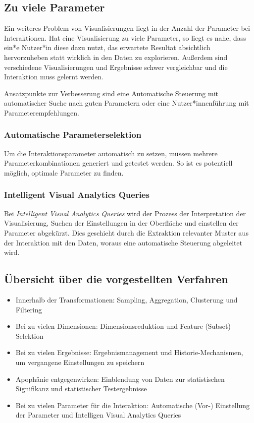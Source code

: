 		\subsection{Zu viele Parameter}
			Ein weiteres Problem von Visualisierungen liegt in der Anzahl der Parameter bei Interaktionen. Hat eine Visualisierung zu viele Parameter, so liegt es nahe, dass ein*e Nutzer*in diese dazu nutzt, das erwartete Resultat absichtlich hervorzuheben statt wirklich in den Daten zu explorieren. Außerdem sind verschiedene Visualisierungen und Ergebnisse schwer vergleichbar und die Interaktion muss gelernt werden.

			Ansatzpunkte zur Verbesserung sind \zB eine Automatische Steuerung mit automatischer Suche nach guten Parametern oder eine Nutzer*innenführung mit Parameterempfehlungen.

			\subsubsection{Automatische Parameterselektion}
				Um die Interaktionsparameter automatisch zu setzen, müssen mehrere Parameterkombinationen generiert und getestet werden. So ist es potentiell möglich, optimale Parameter zu finden.

			\subsubsection{Intelligent Visual Analytics Queries}
				Bei \emph{Intelligent Visual Analytics Queries} wird der Prozess der Interpretation der Visualisierung, Suchen der Einstellungen in der Oberfläche und einstellen der Parameter abgekürzt. Dies geschieht durch die Extraktion relevanter Muster aus der Interaktion mit den Daten, woraus eine automatische Steuerung abgeleitet wird.

		\subsection{Übersicht über die vorgestellten Verfahren}
			\label{subsec:autoVisZsm}

			\begin{itemize}
				\item Innerhalb der Transformationen: Sampling, Aggregation, Clusterung und Filtering
				\item Bei zu vielen Dimensionen: Dimensionsreduktion und Feature (Subset) Selektion
				\item Bei zu vielen Ergebnisse: Ergebnismanagement und Historie-Mechanismen, um vergangene Einstellungen zu speichern
				\item Apophänie entgegenwirken: Einblendung von Daten zur statistischen Signifikanz und statistischer Testergebnisse
				\item Bei zu vielen Parameter für die Interaktion: Automatische (Vor-) Einstellung der Parameter und Intelligen Visual Analytics Queries
			\end{itemize}

